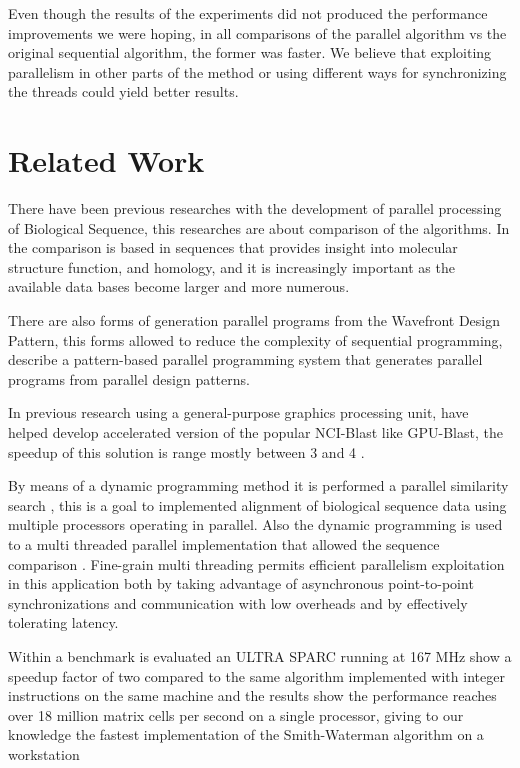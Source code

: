 \documentclass[journal]{IEEEtran}
\begin{document}
Even though the results of the experiments did not produced the performance improvements we were hoping, in all comparisons of the parallel algorithm vs the original sequential algorithm, the former was faster. We believe that exploiting parallelism in other parts of the method or using different ways for synchronizing the threads could yield better results.

\section{Related Work}

There have been previous researches with the development of parallel processing of Biological Sequence, this researches are about comparison of the algorithms. In \cite{edmiston1988parallel} the comparison is based in sequences that provides insight into molecular structure function, and homology, and it is increasingly important as the available data bases become larger and more numerous.

There are also forms of generation parallel programs from the Wavefront Design Pattern, this forms allowed to reduce the complexity of sequential programming, \cite{anvik2001generating} describe a pattern-based parallel programming system that generates parallel programs from parallel design patterns.

In previous research using a general-purpose graphics processing unit, have helped develop accelerated version of the popular NCI-Blast like GPU-Blast, the speedup of this solution is range mostly between 3 and 4 \cite{hughey1996parallel}.

By means of a dynamic programming method it is performed a parallel similarity search \cite{galper1990parallel}, this is a goal to implemented alignment of biological sequence data using multiple processors operating in parallel. Also the dynamic programming is used to a multi threaded parallel implementation that allowed the sequence comparison \cite{martins2001multithreaded}. Fine-grain multi threading permits efficient parallelism exploitation in this application both by taking advantage of asynchronous point-to-point synchronizations and communication with low overheads and by effectively tolerating latency.

Within a benchmark is evaluated an ULTRA SPARC running at 167 MHz show a speedup factor of two compared to the same algorithm implemented with integer instructions on the same machine and the results show the performance reaches over 18 million matrix cells per second on a single processor, giving to our knowledge the fastest implementation of the Smith-Waterman algorithm on a workstation \cite{wozniak1997using}
\end{document}
